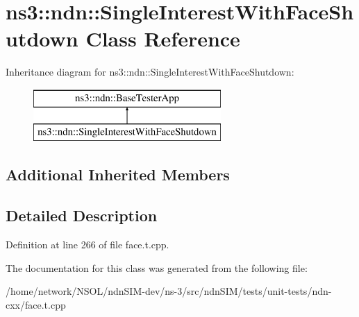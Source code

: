 \hypertarget{classns3_1_1ndn_1_1SingleInterestWithFaceShutdown}{}\section{ns3\+:\+:ndn\+:\+:Single\+Interest\+With\+Face\+Shutdown Class Reference}
\label{classns3_1_1ndn_1_1SingleInterestWithFaceShutdown}
Inheritance diagram for ns3\+:\+:ndn\+:\+:Single\+Interest\+With\+Face\+Shutdown\+:\begin{figure}[H]
\begin{center}
\leavevmode
\includegraphics[height=2.000000cm]{classns3_1_1ndn_1_1SingleInterestWithFaceShutdown}
\end{center}
\end{figure}
\subsection*{Additional Inherited Members}


\subsection{Detailed Description}


Definition at line 266 of file face.\+t.\+cpp.



The documentation for this class was generated from the following file\+:\begin{DoxyCompactItemize}
\item 
/home/network/\+N\+S\+O\+L/ndn\+S\+I\+M-\/dev/ns-\/3/src/ndn\+S\+I\+M/tests/unit-\/tests/ndn-\/cxx/face.\+t.\+cpp\end{DoxyCompactItemize}
